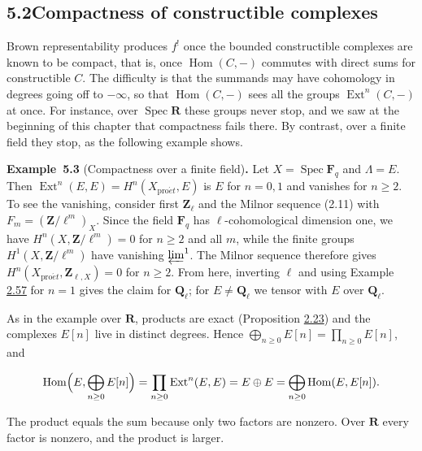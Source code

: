\documentclass[11pt]{article}
\newenvironment{bpstatement}[2]{\par\addvspace{0.6\baselineskip}\noindent\textbf{#1}#2\textbf{.}\enspace\ignorespaces}
  {\par\addvspace{0.4\baselineskip}}
\providecommand{\Ext}{}\renewcommand{\Ext}{\operatorname{Ext}}
\providecommand{\Hom}{}\renewcommand{\Hom}{\operatorname{Hom}}
\begin{document}
\subsection*{\texorpdfstring{5.2\quad Compactness of constructible complexes}{5.2 Compactness of constructible complexes}}
\label{bp415}%
\label{bp416}%
Brown representability produces \(f^!\) once the bounded constructible complexes are known to be compact, that is, once \(\Hom(C,-)\) commutes with direct sums for constructible \(C\). The difficulty is that the summands may have cohomology in degrees going off to \(-\infty\), so that \(\Hom(C,-)\) sees all the groups \(\Ext^n(C,-)\) at once. For instance, over \(\operatorname{Spec}\mathbf R\) these groups never stop, and we saw at the beginning of this chapter that compactness fails there. By contrast, over a finite field they stop, as the following example shows.

\label{bp417}%
\begin{bpstatement}{Example~5.3}{ (Compactness over a finite field)}
Let \(X=\operatorname{Spec}\mathbf F_q\) and \(\Lambda=E\). Then \(\Ext^n(E,E)=H^n(X_{\mathrm{pro}\acute{e}t},E)\) is \(E\) for \(n=0,1\) and vanishes for \(n\geq2\). To see the vanishing, consider first \(\mathbf Z_\ell\) and the Milnor sequence (2.11) with \(F_m=(\mathbf Z/\ell^m)_X\). Since the field \(\mathbf F_q\) has \(\ell\)-cohomological dimension one, we have \(H^n(X,\mathbf Z/\ell^m)=0\) for \(n\ge2\) and all \(m\), while the finite groups \(H^1(X,\mathbf Z/\ell^m)\) have vanishing \(\varprojlim^1\). The Milnor sequence therefore gives \(H^n(X_{\mathrm{pro}\acute{e}t},\mathbf Z_{\ell,X})=0\) for \(n\geq2\). From here, inverting \(\ell\) and using Example \hyperref[bp178]{2.57} for \(n=1\) gives the claim for \(\mathbf Q_\ell\); for \(E\neq\mathbf Q_\ell\) we tensor with \(E\) over \(\mathbf Q_\ell\).

As in the example over \(\mathbf R\), products are exact (Proposition \hyperref[bp68]{2.23}) and the complexes \(E[n]\) live in distinct degrees. Hence \(\bigoplus_{n\ge0}E[n]=\prod_{n\ge0}E[n]\), and

\[
\Hom\Bigl(E,\bigoplus_{n\ge0}E[n]\Bigr)
=\prod_{n\ge0}\Ext^n(E,E)
=E\oplus E
=\bigoplus_{n\ge0}\Hom(E,E[n]).
\]

The product equals the sum because only two factors are nonzero. Over \(\mathbf R\) every factor is nonzero, and the product is larger.
\end{bpstatement}
\end{document}
